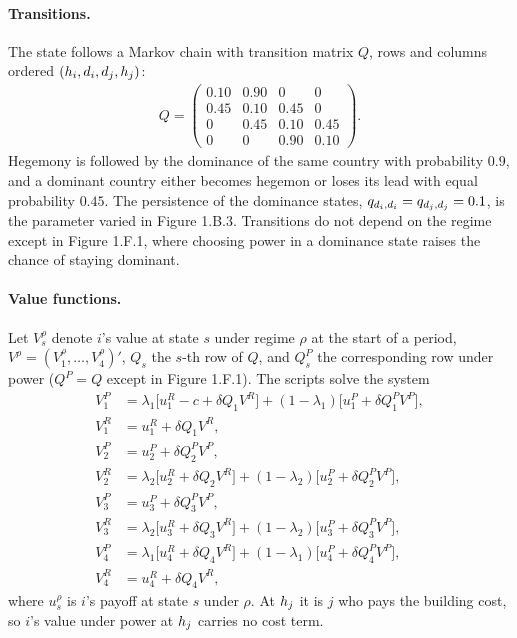 \paragraph*{Transitions.}
The state follows a Markov chain with transition matrix $Q$, rows and
columns ordered $(h_i, d_i, d_j, h_j)$:
\begin{align*}
  Q = \begin{pmatrix}
    0.10 & 0.90 & 0    & 0    \\
    0.45 & 0.10 & 0.45 & 0    \\
    0    & 0.45 & 0.10 & 0.45 \\
    0    & 0    & 0.90 & 0.10
  \end{pmatrix}.
\end{align*}
Hegemony is followed by the dominance of the same country with probability
$0.9$, and a dominant country either becomes hegemon or loses its lead with
equal probability $0.45$. The persistence of the dominance states,
$q_{d_i,d_i} = q_{d_j,d_j} = 0.1$, is the parameter varied in Figure 1.B.3.
Transitions do not depend on the regime except in Figure 1.F.1, where
choosing power in a dominance state raises the chance of staying dominant.

\paragraph*{Value functions.}
Let $V^{\rho}_s$ denote $i$'s value at state $s$ under regime $\rho$ at the
start of a period, $V^{\rho} = (V^{\rho}_1, \dots, V^{\rho}_4)'$, $Q_s$ the
$s$-th row of $Q$, and $Q^P_s$ the corresponding row under power ($Q^P = Q$
except in Figure 1.F.1). The scripts solve the system
\begin{align*}
  V^P_1 &= \lambda_1 \big[u^R_1 - c + \delta Q_1 V^R\big] + (1 - \lambda_1) \big[u^P_1 + \delta Q^P_1 V^P\big], \\
  V^R_1 &= u^R_1 + \delta Q_1 V^R, \\
  V^P_2 &= u^P_2 + \delta Q^P_2 V^P, \\
  V^R_2 &= \lambda_2 \big[u^R_2 + \delta Q_2 V^R\big] + (1 - \lambda_2) \big[u^P_2 + \delta Q^P_2 V^P\big], \\
  V^P_3 &= u^P_3 + \delta Q^P_3 V^P, \\
  V^R_3 &= \lambda_2 \big[u^R_3 + \delta Q_3 V^R\big] + (1 - \lambda_2) \big[u^P_3 + \delta Q^P_3 V^P\big], \\
  V^P_4 &= \lambda_1 \big[u^R_4 + \delta Q_4 V^R\big] + (1 - \lambda_1) \big[u^P_4 + \delta Q^P_4 V^P\big], \\
  V^R_4 &= u^R_4 + \delta Q_4 V^R,
\end{align*}
where $u^{\rho}_s$ is $i$'s payoff at state $s$ under $\rho$. At $h_j$ it is
$j$ who pays the building cost, so $i$'s value under power at $h_j$ carries
no cost term.

